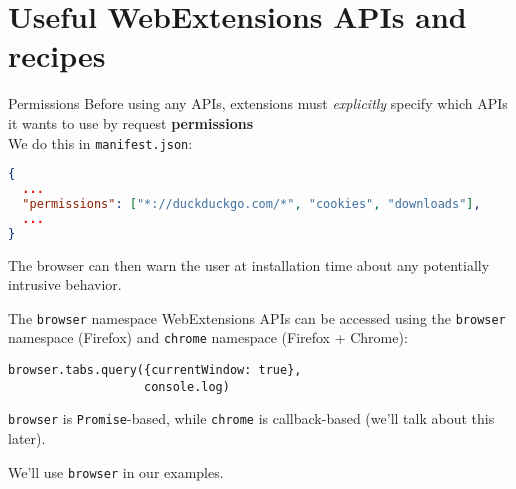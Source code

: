 \documentclass[../index.tex]{subfiles}
\begin{document}

\renewcommand{\sectiontitle}{Useful WebExtensions APIs and recipes}
\section{\sectiontitle}


\renewcommand{\currenttitle}{Permissions}
\begin{frame}[fragile]{\currenttitle}
  Before using any APIs, extensions must \textit{explicitly} specify which APIs
  it wants to use by request \textbf{permissions}\footnotemark{} \\[1em]

  We do this in \texttt{manifest.json}:
  \begin{lstlisting}[language=json]
{
  ...
  "permissions": ["*://duckduckgo.com/*", "cookies", "downloads"],
  ...
}
  \end{lstlisting}

  The browser can then warn the user at installation time about any potentially
  intrusive behavior.

\end{frame}


\renewcommand{\currenttitle}{The \texttt{browser} namespace}
\begin{frame}[fragile]{\currenttitle}
  WebExtensions APIs\footnotemark{} can be accessed using the \texttt{browser} namespace
  (Firefox) and \texttt{chrome} namespace (Firefox + Chrome): \\[1em]

  \begin{lstlisting}[language=ES6,basicstyle=\ttfamily\small]
browser.tabs.query({currentWindow: true},
                   console.log)
  \end{lstlisting}

  \vspace*{1em}

  \texttt{browser} is \texttt{Promise}-based, while \texttt{chrome} is
  callback-based (we'll talk about this later).

  We'll use \texttt{browser} in our examples.

\end{frame}
\end{document}
